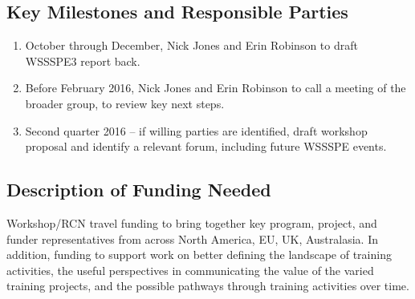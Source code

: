 \subsection{Key Milestones and Responsible Parties}
\begin{enumerate}

\item October through December, Nick Jones and Erin Robinson to draft WSSSPE3 report back.

\item Before February 2016, Nick Jones and Erin Robinson to call a meeting of
the broader group, to review key next steps.
    
\item Second quarter 2016 -- if willing parties are identified, draft workshop proposal
and identify a relevant forum, including future WSSSPE events.
    
\end{enumerate}

\subsection{Description of Funding Needed}

Workshop/RCN travel funding to bring together key program, project, and funder
representatives from across North America, EU, UK, Australasia. In addition,
funding to support work on better defining the landscape of training activities,
the useful perspectives in communicating the value of the varied training
projects, and the possible pathways through training activities over time.
